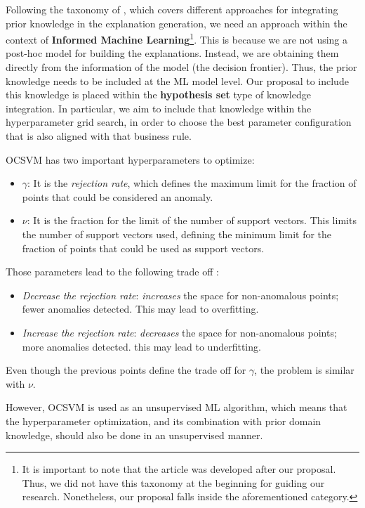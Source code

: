 Following the taxonomy of \parencite{beckh2021explainable}, which covers different approaches for integrating prior knowledge in the explanation generation, we need an approach within the context of \textbf{Informed Machine Learning}\footnote{It is important to note that the article \parencite{beckh2021explainable} was developed after our proposal. Thus, we did not have this taxonomy at the beginning for guiding our research. Nonetheless, our proposal falls inside the aforementioned category.}. This is because we are not using a post-hoc model for building the explanations. Instead, we are obtaining them directly from the information of the model (the decision frontier). Thus, the prior knowledge needs to be included at the ML model level. 
Our proposal to include this knowledge is placed within the \textbf{hypothesis set} type of knowledge integration. In particular, we aim to include that knowledge within the hyperparameter grid search, in order to choose the best parameter configuration that is also aligned with that business rule.

OCSVM has two important hyperparameters to optimize:
\begin{itemize}
    \item $\gamma$: It is the \textit{rejection rate}, which defines the maximum limit for the fraction of points that could be considered an anomaly.
    \item $\nu$: It is the fraction for the limit of the number of support vectors. This limits the number of support vectors used, defining the minimum limit for the fraction of points that could be used as support vectors.
\end{itemize}

Those parameters lead to the following trade off \parencite{xiao2014parameter}:
\begin{itemize}
    \item \textit{Decrease the rejection rate}: \textit{increases} the space for non-anomalous points; fewer anomalies detected. This may lead to overfitting.
    \item \textit{Increase the rejection rate}: \textit{decreases} the space for non-anomalous points; more anomalies detected. this may lead to underfitting.
\end{itemize}
Even though the previous points define the trade off for $\gamma$, the problem is similar with $\nu$.

However, OCSVM is used as an unsupervised ML algorithm, which means that the hyperparameter optimization, and its combination with prior domain knowledge, should also be done in an unsupervised manner.

